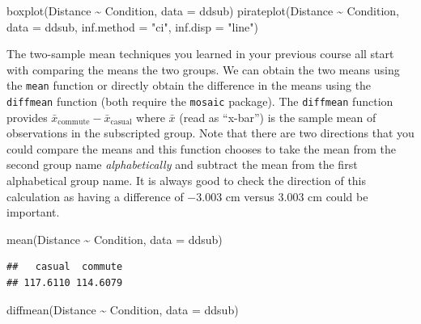 \documentclass[
]{book}
\newenvironment{Shaded}{\begin{snugshade}}{\end{snugshade}}
\newcommand{\AttributeTok}[1]{\textcolor[rgb]{0.77,0.63,0.00}{#1}}
\newcommand{\FunctionTok}[1]{\textcolor[rgb]{0.00,0.00,0.00}{#1}}
\newcommand{\NormalTok}[1]{#1}
\newcommand{\SpecialCharTok}[1]{\textcolor[rgb]{0.00,0.00,0.00}{#1}}
\newcommand{\StringTok}[1]{\textcolor[rgb]{0.31,0.60,0.02}{#1}}
\begin{document}
\begin{Shaded}
\begin{Highlighting}[]
\FunctionTok{boxplot}\NormalTok{(Distance }\SpecialCharTok{\textasciitilde{}}\NormalTok{ Condition, }\AttributeTok{data =}\NormalTok{ ddsub) }
\FunctionTok{pirateplot}\NormalTok{(Distance }\SpecialCharTok{\textasciitilde{}}\NormalTok{ Condition, }\AttributeTok{data =}\NormalTok{ ddsub, }\AttributeTok{inf.method =} \StringTok{"ci"}\NormalTok{, }\AttributeTok{inf.disp =} \StringTok{"line"}\NormalTok{)}
\end{Highlighting}
\end{Shaded}

\indent The two-sample mean techniques you learned in your previous course all
start with comparing the means the two groups. We can obtain the two
means using the \texttt{mean} function or directly obtain the difference
in the means using the \texttt{diffmean} function (both require the \texttt{mosaic}
package). The \texttt{diffmean} function provides
\(\bar{x}_\text{commute} - \bar{x}_\text{casual}\) where \(\bar{x}\)
(read as ``x-bar'') is the sample mean of observations in the subscripted
group. Note that there are two directions that you could compare the
means and this function chooses to take the mean from the second group
name \emph{alphabetically} and subtract the mean from the first alphabetical group
name. It is always good to check the direction of this calculation as
having a difference of \(-3.003\) cm versus \(3.003\) cm could be important.

\begin{Shaded}
\begin{Highlighting}[]
\FunctionTok{mean}\NormalTok{(Distance }\SpecialCharTok{\textasciitilde{}}\NormalTok{ Condition, }\AttributeTok{data =}\NormalTok{ ddsub)}
\end{Highlighting}
\end{Shaded}

\begin{verbatim}
##   casual  commute 
## 117.6110 114.6079
\end{verbatim}

\begin{Shaded}
\begin{Highlighting}[]
\FunctionTok{diffmean}\NormalTok{(Distance }\SpecialCharTok{\textasciitilde{}}\NormalTok{ Condition, }\AttributeTok{data =}\NormalTok{ ddsub)}
\end{Highlighting}
\end{Shaded}
\end{document}
